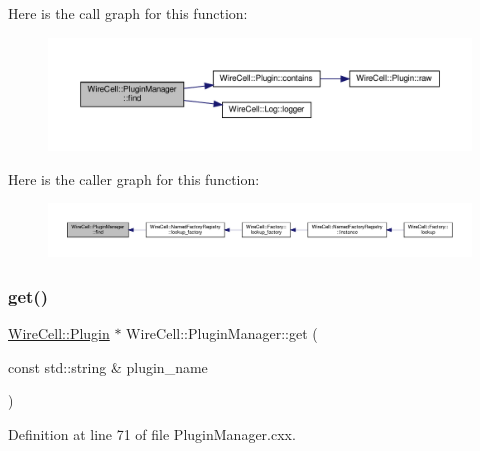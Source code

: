 Here is the call graph for this function\+:
\nopagebreak
\begin{figure}[H]
\begin{center}
\leavevmode
\includegraphics[width=350pt]{class_wire_cell_1_1_plugin_manager_ad83fad032405351bde15ad4abeeef819_cgraph}
\end{center}
\end{figure}
Here is the caller graph for this function\+:
\nopagebreak
\begin{figure}[H]
\begin{center}
\leavevmode
\includegraphics[width=350pt]{class_wire_cell_1_1_plugin_manager_ad83fad032405351bde15ad4abeeef819_icgraph}
\end{center}
\end{figure}
\mbox{\label{class_wire_cell_1_1_plugin_manager_a0a1c54eebefd68844a29101629b70f6e}} 
\subsubsection{\texorpdfstring{get()}{get()}}
{\footnotesize\ttfamily \hyperlink{class_wire_cell_1_1_plugin}{Wire\+Cell\+::\+Plugin} $\ast$ Wire\+Cell\+::\+Plugin\+Manager\+::get (\begin{DoxyParamCaption}\item[{const std\+::string \&}]{plugin\+\_\+name }\end{DoxyParamCaption})}



Definition at line 71 of file Plugin\+Manager.\+cxx.

\mbox{\label{class_wire_cell_1_1_plugin_manager_aa1a081d67e99b8ef796b879e450fc8e0}} 
